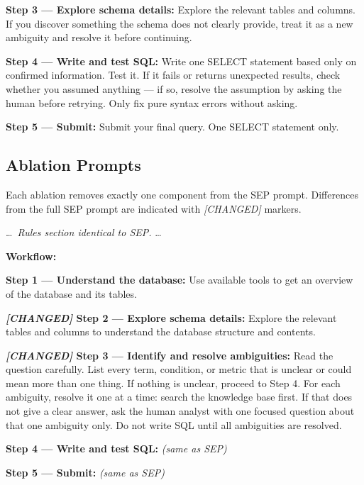 \documentclass{article} %
\newcommand{\oursystem}{SEP} %
\begin{document}
\begin{tcolorbox}[promptbox, title={SEP --- Structured Elicitation Prompting (Relaxed)}]
\textbf{Step 3 --- Explore schema details:}
Explore the relevant tables and columns. If you discover something the schema does not clearly provide, treat it as a new ambiguity and resolve it before continuing.

\textbf{Step 4 --- Write and test SQL:}
Write one SELECT statement based only on confirmed information. Test it. If it fails or returns unexpected results, check whether you assumed anything --- if so, resolve the assumption by asking the human before retrying. Only fix pure syntax errors without asking.

\textbf{Step 5 --- Submit:}
Submit your final query. One SELECT statement only.
\end{tcolorbox}

\subsection{Ablation Prompts}
\label{app:ablation_prompts}

Each ablation removes exactly one component from the \oursystem{} prompt.
Differences from the full \oursystem{} prompt are indicated with \textit{[CHANGED]} markers.

\begin{tcolorbox}[promptbox, title={Abl-A --- Schema-First Ordering (removes ambiguity-before-schema ordering)}]
\small\ttfamily
\ldots\ \textit{Rules section identical to \oursystem{}.} \ldots

\medskip
\textbf{Workflow:}

\textbf{Step 1 --- Understand the database:}
Use available tools to get an overview of the database and its tables.

\textbf{\textit{[CHANGED]} Step 2 --- Explore schema details:}
Explore the relevant tables and columns to understand the database structure and contents.

\textbf{\textit{[CHANGED]} Step 3 --- Identify and resolve ambiguities:}
Read the question carefully. List every term, condition, or metric that is unclear or could mean more than one thing. If nothing is unclear, proceed to Step 4.
For each ambiguity, resolve it one at a time: search the knowledge base first. If that does not give a clear answer, ask the human analyst with one focused question about that one ambiguity only. Do not write SQL until all ambiguities are resolved.

\textbf{Step 4 --- Write and test SQL:} \textit{(same as \oursystem{})}

\textbf{Step 5 --- Submit:} \textit{(same as \oursystem{})}
\end{tcolorbox}
\end{document}
